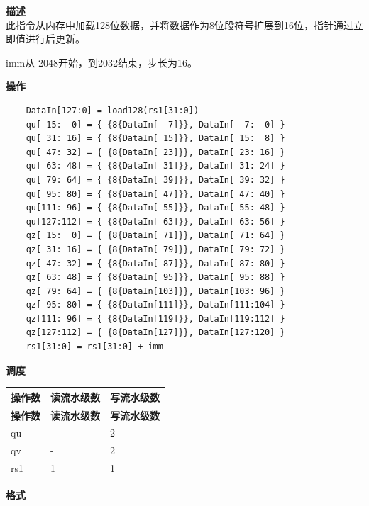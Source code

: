 \textbf{描述}\\
此指令从内存中加载128位数据，并将数据作为8位段符号扩展到16位，指针通过立即值进行后更新。

imm从-2048开始，到2032结束，步长为16。

\textbf{操作}\\
\begin{lstlisting}
    DataIn[127:0] = load128(rs1[31:0])
    qu[ 15:  0] = { {8{DataIn[  7]}}, DataIn[  7:  0] }
    qu[ 31: 16] = { {8{DataIn[ 15]}}, DataIn[ 15:  8] }
    qu[ 47: 32] = { {8{DataIn[ 23]}}, DataIn[ 23: 16] }
    qu[ 63: 48] = { {8{DataIn[ 31]}}, DataIn[ 31: 24] }
    qu[ 79: 64] = { {8{DataIn[ 39]}}, DataIn[ 39: 32] }
    qu[ 95: 80] = { {8{DataIn[ 47]}}, DataIn[ 47: 40] }
    qu[111: 96] = { {8{DataIn[ 55]}}, DataIn[ 55: 48] }
    qu[127:112] = { {8{DataIn[ 63]}}, DataIn[ 63: 56] }
    qz[ 15:  0] = { {8{DataIn[ 71]}}, DataIn[ 71: 64] }
    qz[ 31: 16] = { {8{DataIn[ 79]}}, DataIn[ 79: 72] }
    qz[ 47: 32] = { {8{DataIn[ 87]}}, DataIn[ 87: 80] }
    qz[ 63: 48] = { {8{DataIn[ 95]}}, DataIn[ 95: 88] }
    qz[ 79: 64] = { {8{DataIn[103]}}, DataIn[103: 96] }
    qz[ 95: 80] = { {8{DataIn[111]}}, DataIn[111:104] }
    qz[111: 96] = { {8{DataIn[119]}}, DataIn[119:112] }
    qz[127:112] = { {8{DataIn[127]}}, DataIn[127:120] }
    rs1[31:0] = rs1[31:0] + imm
\end{lstlisting}

\textbf{调度}\\
\begin{longtable}[c]{|l|l|l|}
    \hline
    \rowcolor{lightgray}
    \textbf{操作数} & \textbf{读流水级数} & \textbf{写流水级数} \\\hline
    \endfirsthead
    \hline
    \rowcolor{lightgray}
     \textbf{操作数} & \textbf{读流水级数} & \textbf{写流水级数} \\\hline
    \endhead
    \hline
    \endfoot

  qu & - & 2 \\\hline
  qv & - & 2 \\\hline
  rs1 & 1 & 1

\end{longtable}

\textbf{格式}\\

